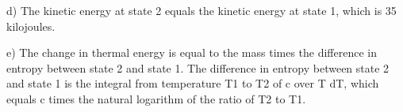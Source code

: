 d) The kinetic energy at state 2 equals the kinetic energy at state 1, which is 35 kilojoules.

e) The change in thermal energy is equal to the mass times the difference in entropy between state 2 and state 1. The difference in entropy between state 2 and state 1 is the integral from temperature T1 to T2 of c over T dT, which equals c times the natural logarithm of the ratio of T2 to T1.